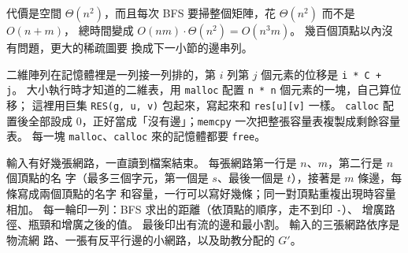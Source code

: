 代價是空間 $\Theta(n^2)$，而且每次 BFS 要掃整個矩陣，花 $\Theta(n^2)$ 而不是 $O(n + m)$，
總時間變成 $O(nm) \cdot \Theta(n^2) = O(n^3 m)$。 幾百個頂點以內沒有問題，更大的稀疏圖要
換成下一小節的邊串列。

\begin{cbookrecap}[第~6~章 6.11 節、第~19~章 19.3 節]
二維陣列在記憶體裡是一列接一列排的，第 $i$ 列第 $j$ 個元素的位移是 \texttt{i * C + j}。
大小執行時才知道的二維表，用 \texttt{malloc} 配置 \texttt{n * n} 個元素的一塊，自己算位移；
這裡用巨集 \texttt{RES(g, u, v)} 包起來，寫起來和 \texttt{res[u][v]} 一樣。 \texttt{calloc}
配置後全部設成 $0$，正好當成「沒有邊」；\texttt{memcpy} 一次把整張容量表複製成剩餘容量
表。 每一塊 \texttt{malloc}、\texttt{calloc} 來的記憶體都要 \texttt{free}。
\end{cbookrecap}

輸入有好幾張網路，一直讀到檔案結束。 每張網路第一行是 $n$、$m$，第二行是 $n$ 個頂點的名
字（最多三個字元，第一個是 $s$、最後一個是 $t$），接著是 $m$ 條邊，每條寫成兩個頂點的名字
和容量，一行可以寫好幾條；同一對頂點重複出現時容量相加。 每一輪印一列：BFS 求出的距離（依頂點的順序，走不到印 \texttt{-}）、
增廣路徑、瓶頸和增廣之後的值。 最後印出有流的邊和最小割。 輸入的三張網路依序是物流網
路、一張有反平行邊的小網路，以及助教分配的 $G'$。


